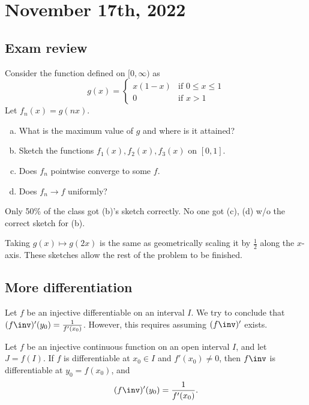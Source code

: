 \documentclass[11pt]{scrartcl}
\numberwithin{equation}{section}
\begin{document}
\section{November 17th, 2022}
\subsection{Exam review}
\begin{ques}
    Consider the function defined on $[0,\infty)$ as 
    \[
        g(x) = \begin{cases}
            x(1-x) &\text{if }0\leq x\leq 1 \\
            0 &\text{if }x>1
        \end{cases}
    \]
    Let $f_n(x)=g(nx)$.
    \begin{enumerate}[a)]
        \item What is the maximum value of $g$ and where is it attained?
        \item Sketch the functions $f_1(x), f_2(x), f_3(x)$ on $[0,1]$.
        \item Does $f_n$ pointwise converge to some $f$.
        \item Does $f_n \to f$ uniformly?
    \end{enumerate}
\end{ques}
Only 50\% of the class got (b)'s sketch correctly.
No one got (c), (d) w/o the correct sketch for (b).
\begin{soln}
    Taking $g(x) \mapsto g(2x)$ is the same as geometrically scaling it by 
    $\frac{1}{2}$ along the $x$-axis. 
    These sketches allow the rest of the problem 
    to be finished.
\end{soln}
\subsection{More differentiation}
Let $f$ be an injective differentiable on an interval $I$.
We try to conclude that $(f\inv)'(y_0) = \frac{1}{f'(x_0)}$.
However, this requires assuming $(f\inv)'$ exists.

\begin{theorem}
    \label{thm:funcinvderivative}
    Let $f$ be an injective continuous function on an open interval $I$, 
    and let $J=f(I)$. If $f$ is differentiable at $x_0\in I$ and 
    $f'(x_0) \neq 0$, then $f\inv$ is differentiable at $y_0=f(x_0)$, and 
    \[
        (f\inv)'(y_0) = \frac{1}{f'(x_0)}.
    \]
\end{theorem}
\end{document}

